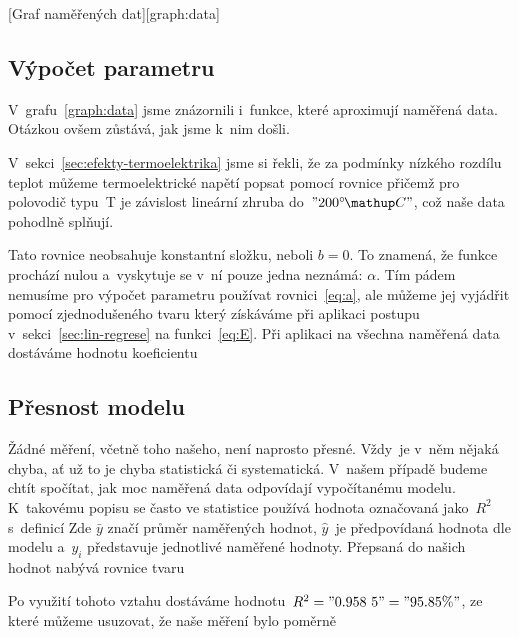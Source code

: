 [Graf naměřených dat][graph:data]

\subsection{Výpočet parametru}
V~grafu~\ref{graph:data} jsme znázornili i~funkce, které aproximují naměřená
data. Otázkou ovšem zůstává, jak jsme k~nim došli.

V~sekci~\ref{sec:efekty-termoelektrika} jsme si řekli, že za podmínky nízkého
rozdílu teplot můžeme termoelektrické napětí popsat pomocí rovnice
přičemž pro polovodič typu~T je závislost lineární zhruba do~$"200 \C"$, což
naše data pohodlně splňují.~\cite{thermocoupleinfo}

Tato rovnice neobsahuje konstantní složku, neboli $b=0$. To znamená, že funkce
prochází nulou a~vyskytuje se v~ní pouze jedna neznámá: $\alpha$. Tím pádem
nemusíme pro výpočet parametru používat rovnici~\eqref{eq:a}, ale můžeme jej
vyjádřit pomocí zjednodušeného tvaru
který získáváme při aplikaci postupu v~sekci~\ref{sec:lin-regrese} na 
funkci~\eqref{eq:E}. Při aplikaci na všechna naměřená data dostáváme hodnotu
koeficientu

\subsection{Přesnost modelu}
Žádné měření, včetně toho našeho, není naprosto přesné. Vždy~je v~něm nějaká chyba,
ať už to je chyba statistická či systematická. V~našem případě budeme chtít 
spočítat, jak moc naměřená data odpovídají vypočítanému modelu. K~takovému
popisu se často ve statistice používá hodnota označovaná jako~$R^2$ s~definicí
Zde $\bar y$ značí průměr naměřených hodnot, $\hat y$~je  předpovídaná hodnota
dle modelu a~$y_i$ představuje jednotlivé naměřené hodnoty. Přepsaná do našich
hodnot nabývá rovnice tvaru

Po využití tohoto vztahu dostáváme hodnotu~$R^2 = "0.958~5" = "95.85 \%"$, ze
které můžeme usuzovat, že naše měření bylo poměrně


